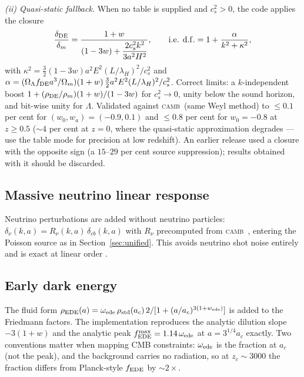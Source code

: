 \documentclass[11pt,a4paper]{article}
\newcommand{\camb}{\textsc{camb}}
\begin{document}
\emph{(ii) Quasi-static fallback.} When no table is supplied and
$c_s^2>0$, the code applies the \citet{SaponeKunz2009} closure
\begin{equation}
\frac{\delta_{\rm DE}}{\delta_m}
= \frac{1+w}{(1-3w) + \dfrac{2c_s^2 k^2}{3a^2H^2}},
\qquad
\mbox{i.e. } {\rm d.f.} = 1+\frac{\alpha}{k^2+\kappa^2},
\label{eq:sk}
\end{equation}
with $\kappa^2=\tfrac32(1-3w)a^2E^2(L/\lambda_H)^2/c_s^2$ and
$\alpha=(\Omega_\Lambda f_{\rm DE}a^3/\Omega_m)(1+w)\,
\tfrac32 a^2E^2 (L/\lambda_H)^2/c_s^2$. Correct limits: a
$k$-independent boost $1+(\rho_{\rm DE}/\rho_m)(1+w)/(1-3w)$ for
$c_s^2\to0$, unity below the sound horizon, and bit-wise unity for
$\Lambda$. Validated against \camb\ (same Weyl method) to
$\le0.1$ per cent for $(w_0,w_a)=(-0.9,0.1)$ and $\le0.8$ per cent
for $w_0=-0.8$ at $z\ge0.5$ ($\sim4$ per cent at $z=0$, where the
quasi-static approximation degrades --- use the table mode for
precision at low redshift). An earlier release used a closure with
the opposite sign (a $15$--$29$ per cent source suppression);
results obtained with it should be discarded.

\subsection{Massive neutrino linear response}

Neutrino perturbations are added without neutrino particles:
$\delta_\nu(k,a) = R_\nu(k,a)\,\delta_{cb}(k,a)$ with
$R_\nu$ precomputed from \camb\ \citep{Lewis2000}, entering the
Poisson source as in Section~\ref{sec:unified}. This avoids
neutrino shot noise entirely and is exact at linear order
\citep[cf.][]{AliHaimoudBird2013}.

\subsection{Early dark energy}

The \citet{Poulin2019} fluid form
$\rho_{\rm EDE}(a)=\omega_{\rm ede}\,\rho_{\rm std}(a_c)\,
2/[1+(a/a_c)^{3(1+w_{\rm ede})}]$ is added to the Friedmann
factors. The implementation reproduces the analytic dilution slope
$-3(1+w)$ and the analytic peak
$f_{\rm EDE}^{\rm max}=1.14\,\omega_{\rm ede}$ at $a=3^{1/4}a_c$
exactly. Two conventions matter when mapping CMB constraints:
$\omega_{\rm ede}$ is the fraction at $a_c$ (not the peak), and
the background carries no radiation, so at $z_c\sim3000$ the
fraction differs from Planck-style $f_{\rm EDE}$ by $\sim2\times$.
\end{document}
